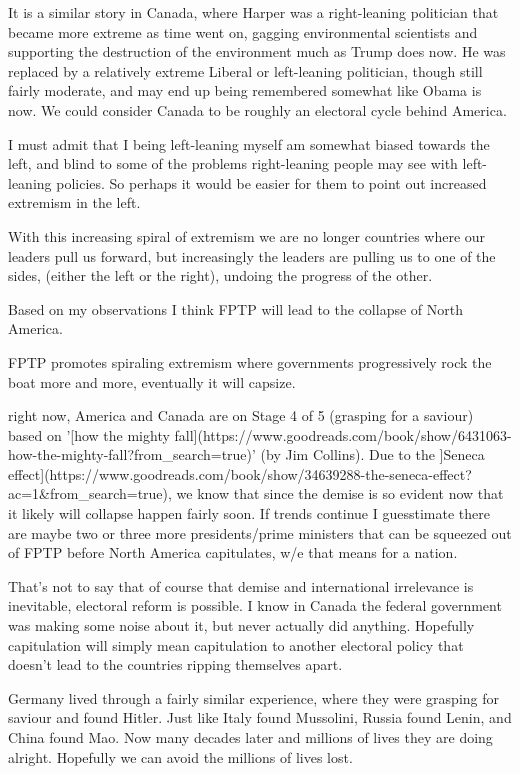 It is a similar story in Canada, where Harper was a right-leaning politician
that became more extreme as time went on, gagging environmental scientists and
supporting the destruction of the environment much as Trump does now. He was
replaced by a relatively extreme Liberal or left-leaning politician, though
still fairly moderate, and may end up being remembered somewhat like Obama is
now. We could consider Canada to be roughly an electoral cycle behind America. 

I must admit that I being left-leaning myself am somewhat biased towards the
left, and blind to some of the problems right-leaning people may see with
left-leaning policies. So perhaps it would be easier for them to point out
increased  extremism in the left. 

With this increasing spiral of extremism we are no longer countries where our
leaders pull us forward, but increasingly the leaders are pulling us to one of
the sides, (either the left or the right), undoing the progress of the other.  

Based on my observations I think FPTP will lead to the collapse of North America.

FPTP promotes spiraling extremism where governments progressively rock the boat more and more, eventually it will capsize.

right now, America and Canada are on Stage 4 of 5 (grasping for a saviour) 
based on '[how the mighty fall](https://www.goodreads.com/book/show/6431063-how-the-mighty-fall?from_search=true)' (by Jim Collins). 
Due to the ]Seneca effect](https://www.goodreads.com/book/show/34639288-the-seneca-effect?ac=1&from_search=true), 
we know that since the demise is so evident now that it likely will collapse happen fairly soon. 
If trends continue I guesstimate there are maybe two or three more 
presidents/prime ministers that can be squeezed out of FPTP 
before North America capitulates, w/e that means for a nation.

That's not to say that of course that demise and international irrelevance is 
inevitable, electoral reform is possible.  I know in Canada the federal 
government was making some noise about it, but never actually did anything.   
Hopefully capitulation will simply mean capitulation to another electoral 
policy that doesn't lead to the countries 
ripping themselves apart. 

Germany lived through a fairly similar experience, where they were grasping for
saviour and found Hitler. Just like Italy found Mussolini, Russia found Lenin,
and China found Mao. Now many decades later and millions of lives they are doing
alright. Hopefully we can avoid the millions of lives lost. 

